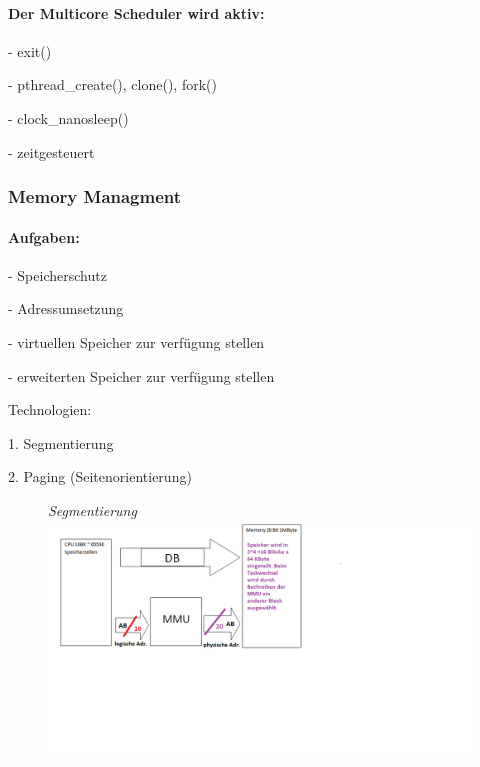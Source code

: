 \documentclass[12pt,a4paper,oneside,ngerman]{article}
\begin{document}
\paragraph{Der Multicore Scheduler wird aktiv:}
\begin{description}
	\item - exit()
	\item - pthread\_create(), clone(), fork()
	\item - clock\_nanosleep()
	\item - zeitgesteuert
\end{description}

\subsubsection{Memory Managment}
\paragraph{Aufgaben:}
\begin{description}
	\item - Speicherschutz
	\item - Adressumsetzung
	\item - virtuellen Speicher zur verfügung stellen
	\item - erweiterten Speicher zur verfügung stellen
\end{description}
Technologien:
\begin{description}
	\item 1. Segmentierung
	\item 2. Paging (Seitenorientierung)
\end{description}

\begin{figure}[ht]
	\emph{Segmentierung}
	\centering
	\includegraphics[scale=0.8]{umlet/Seite_30.png}
\end{figure}
\end{document}
